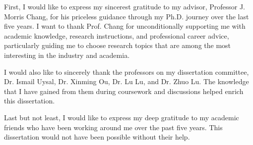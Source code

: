 \par First, I would like to express my sincerest gratitude to my advisor,
Professor J. Morris Chang, for his priceless guidance through my Ph.D. journey over
the last five years. I want to thank Prof. Chang for unconditionally supporting me
with academic knowledge, research instructions, and professional career advice, particularly
guiding me to choose research topics that are among the most interesting in the industry
and academia.

I would also like to sincerely thank the professors on my dissertation committee, Dr. Ismail Uysal, Dr. Xinming Ou, Dr. Lu Lu, and Dr. Zhuo Lu. The knowledge that I
have gained from them during coursework and discussions helped enrich this dissertation.

Last but not least, I would like to express my deep gratitude to my academic friends who have been working around me over the past five years. This dissertation would not have been possible without their help.